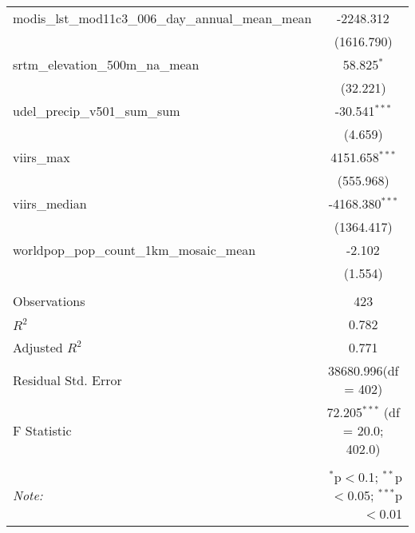 \begin{table}[!htbp]
\begin{tabular}{@{\extracolsep{5pt}}lc}
 modis_lst_mod11c3_006_day_annual_mean_mean & -2248.312$^{}$ \\
  & (1616.790) \\
 srtm_elevation_500m_na_mean & 58.825$^{*}$ \\
  & (32.221) \\
 udel_precip_v501_sum_sum & -30.541$^{***}$ \\
  & (4.659) \\
 viirs_max & 4151.658$^{***}$ \\
  & (555.968) \\
 viirs_median & -4168.380$^{***}$ \\
  & (1364.417) \\
 worldpop_pop_count_1km_mosaic_mean & -2.102$^{}$ \\
  & (1.554) \\
\hline \\[-1.8ex]
 Observations & 423 \\
 $R^2$ & 0.782 \\
 Adjusted $R^2$ & 0.771 \\
 Residual Std. Error & 38680.996(df = 402)  \\
 F Statistic & 72.205$^{***}$ (df = 20.0; 402.0) \\
\hline
\hline \\[-1.8ex]
\textit{Note:} & \multicolumn{1}{r}{$^{*}$p$<$0.1; $^{**}$p$<$0.05; $^{***}$p$<$0.01} \\
\end{tabular}
\end{table}